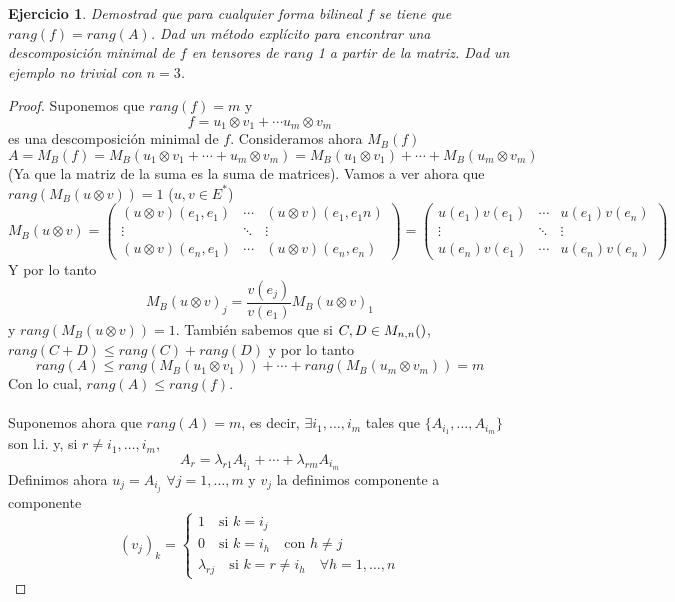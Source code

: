 \documentclass[12pt]{article}
\let\k\relax
\newcommand{\k}{\mathbf{k}}
\theoremstyle{break}
\newtheorem{ej}{Ejercicio}
\newtheorem*{proof}{Demostración}
\begin{document}
\begin{ej}\label{rango_tens}
	Demostrad que para cualquier forma bilineal $f$ se tiene que $rang(f) = rang(A)$.
	Dad un método explícito para encontrar una descomposición minimal de $f$ en tensores
	de $rang$ 1 a partir de la matriz. Dad un ejemplo no trivial con $n = 3$.
\end{ej}
\begin{proof}
	Suponemos que $rang(f) = m$ y
	\[
		f = u_1 \otimes v_1 + \cdots u_m \otimes v_m
	\]
	es una descomposición minimal de $f$. Consideramos ahora $M_B(f)$
	\[
		A = M_B(f) = M_B(u_1 \otimes v_1 + \cdots + u_m \otimes v_m) = M_B(u_1 \otimes v_1) +
		\cdots + M_B(u_m \otimes v_m)
	\]
	(Ya que la matriz de la suma es la suma de matrices). Vamos a ver ahora que
	$rang(M_B(u \otimes v)) = 1$ ($u,v \in E^*$)
	\[
		M_B(u \otimes v) = \begin{pmatrix}
			(u \otimes v)(e_1,e_1) & \cdots & (u \otimes v)(e_1,e_1n) \\
			\vdots & \ddots & \vdots \\
			(u \otimes v)(e_n,e_1) & \cdots & (u \otimes v)(e_n,e_n)
		\end{pmatrix} = \begin{pmatrix}
			u(e_1)v(e_1) & \cdots & u(e_1)v(e_n) \\ \vdots & \ddots & \vdots \\
			u(e_n)v(e_1) & \cdots & u(e_n)v(e_n)
		\end{pmatrix}
	\]
	Y por lo tanto 
	\[
		M_B(u \otimes v)_j = \frac{v(e_j)}{v(e_1)} M_B(u \otimes v)_1
	\]
	y $rang(M_B(u \otimes v)) = 1$. También sabemos que si $C,D \in M_{n, n}(\k)$, $rang(C+D) \leq rang(C) + rang(D)$ y por lo tanto
	\[
		rang(A) \leq rang(M_B(u_1 \otimes v_1)) + \cdots + rang(M_B(u_m \otimes v_m)) = m
	\]
	Con lo cual, $rang(A) \leq rang(f)$.
	\\ \\	
	Suponemos ahora que $rang(A) = m$, es decir, $\exists i_1,\dots,i_m$ tales que
	$\{A_{i_1},\dots,A_{i_m}\}$ son l.i. y, si $r \neq i_1,\dots,i_m$,
	\[
		A_r = \lambda_{r1}A_{i_1} + \cdots + \lambda_{rm} A_{i_m}
	\]
	Definimos ahora $u_j = A_{i_j}$ $\forall j=1,\dots,m$ y $v_j$ la definimos componente
	a componente
	\[
		\left( v_j \right)_k = \begin{cases}
			1 \quad \text{si } k = i_j \\
			0 \quad \text{si } k = i_h \quad \text{con } h \neq j \\
			\lambda_{rj} \quad \text{si } k = r \neq i_h \quad \forall h = 1,\dots,n
		\end{cases}
\]
\end{proof}
\end{document}
